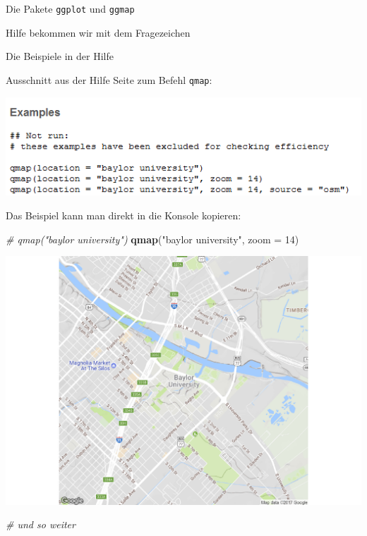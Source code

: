 \documentclass[ignorenonframetext,]{beamer}
\newenvironment{Shaded}{}{}
\newcommand{\KeywordTok}[1]{\textcolor[rgb]{0.00,0.44,0.13}{\textbf{{#1}}}}
\newcommand{\DataTypeTok}[1]{\textcolor[rgb]{0.56,0.13,0.00}{{#1}}}
\newcommand{\DecValTok}[1]{\textcolor[rgb]{0.25,0.63,0.44}{{#1}}}
\newcommand{\StringTok}[1]{\textcolor[rgb]{0.25,0.44,0.63}{{#1}}}
\newcommand{\CommentTok}[1]{\textcolor[rgb]{0.38,0.63,0.69}{\textit{{#1}}}}
\newcommand{\NormalTok}[1]{{#1}}
\begin{document}
\begin{frame}[fragile]{Die Pakete \texttt{ggplot} und \texttt{ggmap}}
\begin{block}{Hilfe bekommen wir mit dem Fragezeichen}
\end{block}

\begin{block}{Die Beispiele in der Hilfe}

Ausschnitt aus der Hilfe Seite zum Befehl \texttt{qmap}:

\includegraphics{./tex2pdf.9796/49a33a1653041480fa66729550047b3b586c59da.png}

Das Beispiel kann man direkt in die Konsole kopieren:

\begin{Shaded}
\begin{Highlighting}[]
\CommentTok{# qmap("baylor university")}
\KeywordTok{qmap}\NormalTok{(}\StringTok{"baylor university"}\NormalTok{, }\DataTypeTok{zoom =} \DecValTok{14}\NormalTok{)}
\end{Highlighting}
\end{Shaded}

\includegraphics{R_intern_files/figure-beamer/unnamed-chunk-258-1.pdf}

\begin{Shaded}
\begin{Highlighting}[]
\CommentTok{# und so weiter}
\end{Highlighting}
\end{Shaded}


\end{block}
\end{frame}
\end{document}

